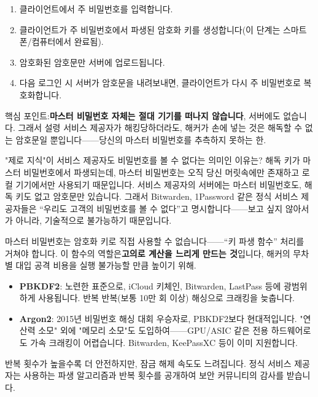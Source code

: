\begin{enumerate}
  \item 클라이언트에서 주 비밀번호를 입력합니다.
  \item 클라이언트가 주 비밀번호에서 파생된 암호화 키를 생성합니다(이 단계는 스마트폰/컴퓨터에서 완료됨).
  \item 암호화된 암호문만 서버에 업로드됩니다.
  \item 다음 로그인 시 서버가 암호문을 내려보내면, 클라이언트가 다시 주 비밀번호로 복호화합니다.
\end{enumerate}

핵심 포인트:\textbf{마스터 비밀번호 자체는 절대 기기를 떠나지 않습니다}, 서버에도 없습니다. 그래서 설령 서비스 제공자가 해킹당하더라도, 해커가 손에 넣는 것은 해독할 수 없는 암호문일 뿐입니다——당신의 마스터 비밀번호를 추측하지 못하는 한.

\begin{tcbinfo}{"제로 지식"이 서비스 제공자도 비밀번호를 볼 수 없다는 의미인 이유는?}
해독 키가 마스터 비밀번호에서 파생되는데, 마스터 비밀번호는 오직 당신 머릿속에만 존재하고 로컬 기기에서만 사용되기 때문입니다. 서비스 제공자의 서버에는 마스터 비밀번호도, 해독 키도 없고 암호문만 있습니다. 그래서 Bitwarden, 1Password 같은 정식 서비스 제공자들은 “우리도 고객의 비밀번호를 볼 수 없다”고 명시합니다——보고 싶지 않아서가 아니라, 기술적으로 불가능하기 때문입니다.

\end{tcbinfo}


마스터 비밀번호는 암호화 키로 직접 사용할 수 없습니다——“키 파생 함수” 처리를 거쳐야 합니다. 이 함수의 역할은\textbf{고의로 계산을 느리게 만드는 것}입니다, 해커의 무차별 대입 공격 비용을 실행 불가능할 만큼 높이기 위해.

\begin{itemize}
  \item \textbf{PBKDF2}: 노련한 표준으로, iCloud 키체인, Bitwarden, LastPass 등에 광범위하게 사용됩니다. 반복 반복(보통 10만 회 이상) 해싱으로 크래킹을 늦춥니다.
  \item \textbf{Argon2}: 2015년 비밀번호 해싱 대회 우승자로, PBKDF2보다 현대적입니다. "연산력 소모" 외에 "메모리 소모"도 도입하여——GPU/ASIC 같은 전용 하드웨어로도 가속 크래킹이 어렵습니다. Bitwarden, KeePassXC 등이 이미 지원합니다.
\end{itemize}

반복 횟수가 높을수록 더 안전하지만, 잠금 해제 속도도 느려집니다. 정식 서비스 제공자는 사용하는 파생 알고리즘과 반복 횟수를 공개하여 보안 커뮤니티의 감사를 받습니다.

